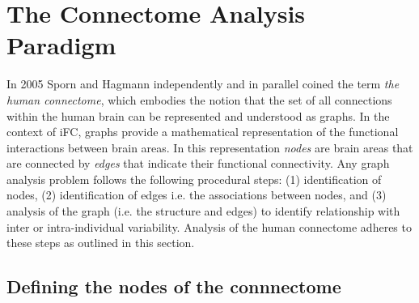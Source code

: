 \section{The Connectome Analysis Paradigm}

In 2005 Sporn and Hagmann \cite{Sporns2005,Hagmann2005} independently and in parallel coined the term \textit{the human connectome}, which embodies the notion that the set of all connections within the human brain can be represented and understood as graphs. In the context of iFC, graphs provide a mathematical representation of the functional interactions between brain areas. In this representation \emph{nodes} are brain areas that are connected by \emph{edges} that indicate their functional connectivity. Any graph analysis problem follows the following procedural steps: (1) identification of nodes, (2) identification of edges i.e. the associations between nodes, and (3) analysis of the graph (i.e. the structure and edges) to identify relationship with inter or intra-individual variability. Analysis of the human connectome adheres to these steps as outlined in this section. 

\subsection{Defining the nodes of the connnectome}

